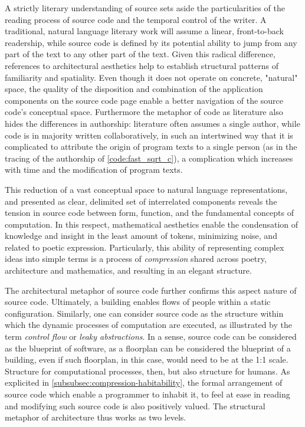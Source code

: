 A strictly literary understanding of source sets aside the particularities of the reading process of source code and the temporal control of the writer. A traditional, natural language literary work will assume a linear, front-to-back readership, while source code is defined by its potential ability to jump from any part of the text to any other part of the text. Given this radical difference, references to architectural aesthetics help to establish structural patterns of familiarity and spatiality. Even though it does not operate on concrete, "natural" space, the quality of the disposition and combination of the application components on the source code page enable a better navigation of the source code's conceptual space. Furthermore the metaphor of code as literature also hides the differences in authorship: literature often assumes a single author, while code is in majority written collaboratively, in such an intertwined way that it is complicated to attribute the origin of program texts to a single person (as in the tracing of the authorship of \ref{code:fast_sqrt_c}), a complication which increases with time and the modification of program texts.

This reduction of a vast conceptual space to natural language representations, and presented as clear, delimited set of interrelated components reveals the tension in source code between form, function, and the fundamental concepts of computation. In this respect, mathematical aesthetics enable the condensation of knowledge and insight in the least amount of tokens, minimizing noise, and related to poetic expression. Particularly, this ability of representing complex ideas into simple terms is a process of \emph{compression} shared across poetry, architecture and mathematics, and resulting in an elegant structure.

The architectural metaphor of source code further confirms this aspect nature of source code. Ultimately, a building enables flows of people within a static configuration. Similarly, one can consider source code as the structure within which the dynamic processes of computation are executed, as illustrated by the term \emph{control flow} or \emph{leaky abstractions}. In a sense, source code can be considered as the blueprint of software, as a floorplan can be considered the blueprint of a building, even if such floorplan, in this case, would need to be at the 1:1 scale. Structure for computational processes, then, but also structure for humans. As explicited in \ref{subsubsec:compression-habitability}, the formal arrangement of source code which enable a programmer to inhabit it, to feel at ease in reading and modifying such source code is also positively valued. The structural metaphor of architecture thus works as two levels.


